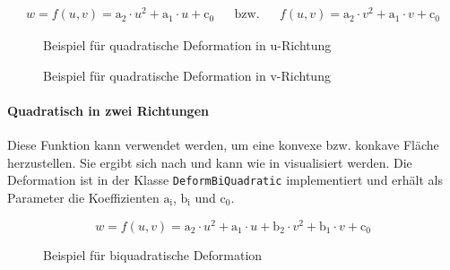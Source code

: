 \begin{equation}\label{eq:quadratic}
	\begin{aligned}
		w=f(u,v) = \mathrm{a_2}\cdot u^2+ \mathrm{a_1}\cdot u+\mathrm{c_0}&&\mathrm{bzw.}&&f(u,v) = \mathrm{a_2}\cdot v^2+ \mathrm{a_1}\cdot v+\mathrm{c_0} 
	\end{aligned}
\end{equation} 

\begin{figure}[h]
	\centering
	\caption{Beispiel für quadratische Deformation in u-Richtung}
	\label{fig:quadraticu}
\end{figure}

\begin{figure}[h]
	\centering
	\caption{Beispiel für quadratische Deformation in v-Richtung}
	\label{fig:quadraticv}
\end{figure} 

\clearpage
\paragraph{Quadratisch in zwei Richtungen} Diese Funktion kann verwendet werden, um eine konvexe bzw. konkave Fläche herzustellen. Sie ergibt sich nach  und kann wie in  visualisiert werden. Die Deformation ist in der Klasse \verb|DeformBiQuadratic| implementiert und erhält als Parameter die Koeffizienten $\mathrm{a_i}$, $\mathrm{b_i}$ und $\mathrm{c_0}$.

\begin{equation}\label{eq:biquadratic}
w=f(u,v) = \mathrm{a_2}\cdot u^2+ \mathrm{a_1}\cdot u+\mathrm{b_2}\cdot v^2+ \mathrm{b_1}\cdot v+\mathrm{c_0}
\end{equation} 


\begin{figure}[h]
	\centering
	\caption{Beispiel für biquadratische Deformation}
	\label{fig:biquadraticfig}
\end{figure}  


